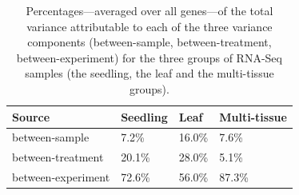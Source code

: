 \documentclass[fleqn,10pt,lineno]{wlpeerj} %
\begin{document}
	\begin{center} 
		\begin{table}[!ht] 
			\centering 
			\caption[Percentages---averaged over all genes---of the total
			variance attributable to each of the three variance components]{Percentages---averaged 
				over all genes---of the total
				variance attributable to each of the three variance components
				(between-sample, between-treatment, between-experiment) for the three
				groups of RNA-Seq samples (the seedling, the leaf and the
				multi-tissue groups). %
			} 
			\label{table:percentageofvariation}
			
			\begin{tabular}{lp{3cm}p{2.5cm}p{3cm}}\hline
				Source & Seedling & Leaf & Multi-tissue \\  \hline
				between-sample & 7.2\% & 16.0\% & 7.6\% \\ 
				between-treatment & 20.1\% & 28.0\% & 5.1\% \\ 
				between-experiment & 72.6\% & 56.0\% & 87.3\% \\ \hline
			\end{tabular} \end{table} \end{center}
			
\end{document}

